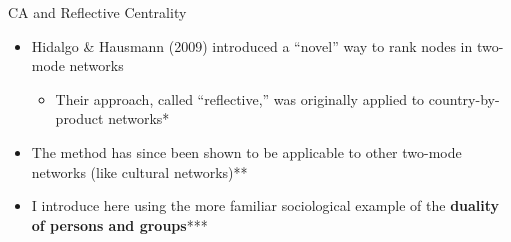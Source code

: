 \documentclass[
  ignorenonframetext,
]{beamer}
\providecommand{\tightlist}{%
  \setlength{\itemsep}{0pt}\setlength{\parskip}{0pt}}\usepackage{longtable,booktabs,array}
\begin{document}
\begin{frame}{CA and Reflective Centrality}
\protect\hypertarget{ca-and-reflective-centrality}{}
\begin{itemize}
\tightlist
\item
  Hidalgo \& Hausmann (2009) introduced a ``novel'' way to rank nodes in
  two-mode networks

  \begin{itemize}
  \tightlist
  \item
    Their approach, called ``reflective,'' was originally applied to
    country-by-product networks*
  \end{itemize}
\end{itemize}

\pause

\begin{itemize}
\tightlist
\item
  The method has since been shown to be applicable to other two-mode
  networks (like cultural networks)**
\item
  I introduce here using the more familiar sociological example of the
  \textbf{duality of persons and groups}***
\end{itemize}

\end{frame}
\end{document}
